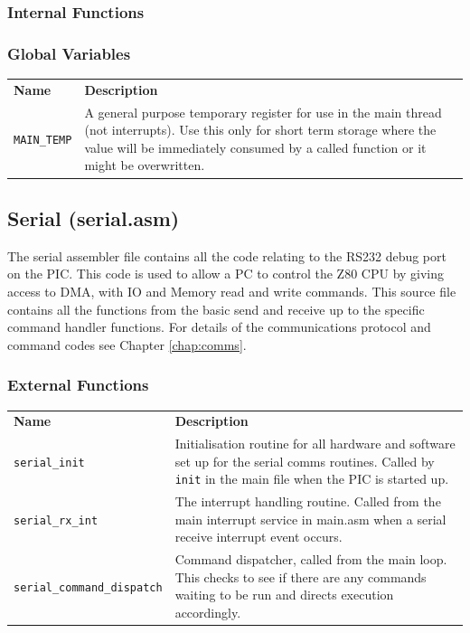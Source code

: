 \documentclass[a4paper,10pt]{book}
\begin{document}
\subsubsection{Internal Functions}

\subsubsection{Global Variables}
\begin{tabular}{lp{8cm}}
 \textbf{Name}&\textbf{Description}\\
 \texttt{MAIN\_TEMP}&A general purpose temporary register for use in the main thread (not interrupts).  Use this only for short term storage where the value will be immediately consumed by a called function or it might be overwritten.\\
\end{tabular}


\subsection{Serial (serial.asm)}
The serial assembler file contains all the code relating to the RS232 debug port on the PIC.  This code is used to allow a PC to control the Z80 CPU by giving access to DMA, with IO and Memory read and write commands.  This source file contains all the functions from the basic send and receive up to the specific command handler functions.  For details of the communications protocol and command codes see Chapter \ref{chap:comms}.

\subsubsection{External Functions}
\begin{tabular}{lp{8cm}}
 \textbf{Name}&\textbf{Description}\\
 \texttt{serial\_init}&Initialisation routine for all hardware and software set up for the serial comms routines.  Called by \texttt{init} in the main file when the PIC is started up.\\
 \texttt{serial\_rx\_int}&The interrupt handling routine.  Called from the main interrupt service in main.asm when a serial receive interrupt event occurs.\\
 \texttt{serial\_command\_dispatch}&Command dispatcher, called from the main loop.  This checks to see if there are any commands waiting to be run and directs execution accordingly.\\
\end{tabular}
\end{document}
